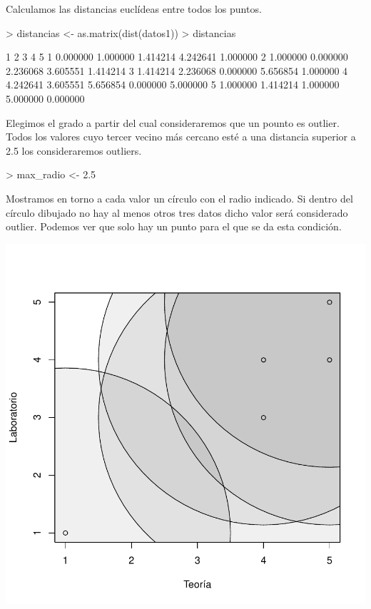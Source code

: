 \documentclass [a4paper] {article}
\begin{document}
Calculamos las distancias euclídeas entre todos los puntos.
\begin{Schunk}
\begin{Sinput}
> distancias <- as.matrix(dist(datos1))
> distancias
\end{Sinput}
\begin{Soutput}
         1        2        3        4        5
1 0.000000 1.000000 1.414214 4.242641 1.000000
2 1.000000 0.000000 2.236068 3.605551 1.414214
3 1.414214 2.236068 0.000000 5.656854 1.000000
4 4.242641 3.605551 5.656854 0.000000 5.000000
5 1.000000 1.414214 1.000000 5.000000 0.000000
\end{Soutput}
\end{Schunk}

Elegimos el grado a partir del cual consideraremos que un pounto es outlier.
Todos los valores cuyo tercer vecino más cercano esté a una distancia superior a 2.5 los consideraremos outliers.
\begin{Schunk}
\begin{Sinput}
> max_radio <- 2.5
\end{Sinput}
\end{Schunk}

Mostramos en torno a cada valor un círculo con el radio indicado.
Si dentro del círculo dibujado no hay al menos otros tres datos dicho valor será considerado outlier.
Podemos ver que solo hay un punto para el que se da esta condición.
\begin{center}
\includegraphics{entrega-k_vecinos_plot}
\end{center}
\end{document}
